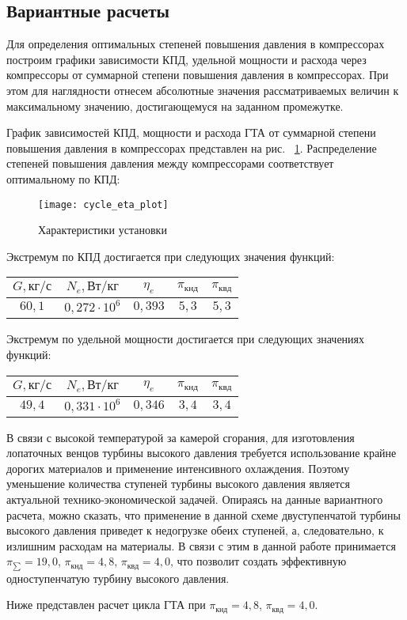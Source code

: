 \subsection{Вариантные расчеты}
Для определения оптимальных степеней повышения давления в компрессорах
построим графики зависимости КПД, удельной мощности и расхода через компрессоры от суммарной степени повышения давления в компрессорах.
При этом для наглядности отнесем абсолютные значения рассматриваемых величин к максимальному значению,
достигающемуся на заданном промежутке.

График зависимостей КПД,
мощности и расхода ГТА от суммарной степени повышения давления в компрессорах представлен на рис. ~\ref{img:cycle_eta_plot}.
Распределение степеней повышения давления между компрессорами соответствует оптимальному по КПД:
\begin{figure}[H]
    \centering
	\texttt{[image: cycle\_eta\_plot]}
	\caption{Характеристики установки}
	\label{img:cycle_eta_plot}
\end{figure}

Экстремум по КПД достигается при следующих значения функций:
\begin{center}
	\begin{tabular}{|c|c|c|c|c|}
	\hline
		$G, кг/с$ & $N_e, Вт/кг$ & $\eta_e$ & $\pi_{кнд}$ & $\pi_{квд}$ \\ \hline
		$60,1$ &
		$0,272 \cdot 10^6$ &
		$0,393$ &
		$5,3$ &
		$5,3$ \\ \hline
	\end{tabular}
\end{center}

Экстремум по удельной мощности достигается при следующих значениях функций:
\begin{center}
	\begin{tabular}{|c|c|c|c|c|}
	\hline
		$G, кг/с$ & $N_e, Вт/кг$ & $\eta_e$ & $\pi_{кнд}$ & $\pi_{квд}$ \\ \hline
		$49,4$ &
		$0,331 \cdot 10^6$ &
		$0,346$ &
		$3,4$ &
		$3,4$ \\ \hline
	\end{tabular}
\end{center}

В связи с высокой температурой за камерой сгорания, для изготовления лопаточных венцов турбины высокого давления требуется
использование крайне дорогих материалов и применение интенсивного охлаждения. Поэтому уменьшение количества ступеней
турбины высокого давления является актуальной технико-экономической задачей. Опираясь на данные вариантного расчета,
можно сказать, что применение в данной схеме двуступенчатой турбины высокого давления приведет к недогрузке
обеих ступеней, а, следовательно, к излишним расходам на материалы. В связи с этим в данной работе принимается
$\pi_{\sum} = 19,0$, $\pi_{кнд} = 4,8$, $\pi_{квд} = 4,0$,
что позволит создать эффективную одноступенчатую турбину высокого давления.

Ниже представлен расчет цикла ГТА при $\pi_{кнд} = 4,8$, $\pi_{квд} = 4,0$.
